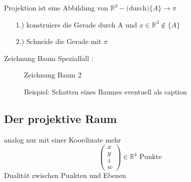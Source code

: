 \documentclass[11pt]{article}
\begin{document}
Projektion ist eine Abbildung von $\mathbb{R}^3 - \text{(durch)}\{A\}\rightarrow \pi$

\begin{enumerate}
\item[1.)] konstruiere die Gerade durch A und $x \in \mathbb{R}^3 \notin \{A\}$
\item[2.)] Schneide die Gerade mit $\pi$
\end{enumerate}
{\color{red}Zeichnung Baum}
Spezialfall :\\
\begin{figure}[!hb]
\begin{minipage}[c]{5cm}
{\color{red}Zeichnung Baum 2}
\end{minipage}
\hfill
\begin{minipage}[l]{7cm}
Beispiel: Schatten eines Baumes
{\color{green}eventuell als caption}
\end{minipage}
\end{figure}
\subsection{Der projektive Raum}
analog nur mit einer Koordinate mehr
$$
\begin{pmatrix}
x\\ y \\ z \\ w
\end{pmatrix} \in \mathbb{R}^4 \text{ Punkte}
$$
Dualität zwischen Punkten und Ebenen
\end{document}
